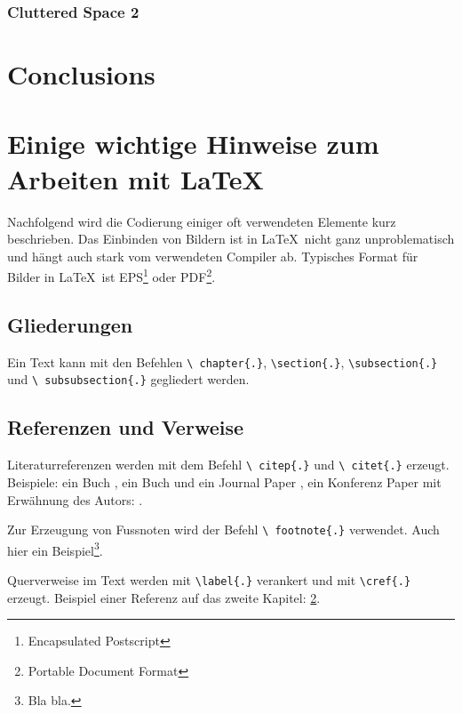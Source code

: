 \subsection{Cluttered Space 2}
\chapter{Conclusions}

\chapter{Einige wichtige Hinweise zum Arbeiten mit \LaTeX\ }
\label{sec:latexumg}

Nachfolgend wird die Codierung einiger oft verwendeten Elemente
kurz beschrieben. Das Einbinden von Bildern ist in \LaTeX\ nicht
ganz unproblematisch und hängt auch stark vom verwendeten Compiler
ab. Typisches Format für Bilder in \LaTeX\ ist
EPS\footnote{Encapsulated Postscript} oder PDF\footnote{Portable Document Format}.


\section{Gliederungen}
\label{sec:gliederung}

Ein Text kann mit den Befehlen \texttt{\textbackslash
chapter\{.\}}, \texttt{\textbackslash section\{.\}},
\texttt{\textbackslash subsection\{.\}} und \texttt{\textbackslash
subsubsection\{.\}} gegliedert werden.


\section{Referenzen und Verweise}
\label{sec:refverw}

Literaturreferenzen werden mit dem Befehl \texttt{\textbackslash
citep\{.\}} und \texttt{\textbackslash
citet\{.\}} erzeugt. Beispiele: ein Buch \citep{Raibert1986LeggedRobotsThatBalance}, ein Buch und ein Journal Paper \citep{Raibert1986LeggedRobotsThatBalance,Vukobratovic2004ZeroMomentPoint}, ein Konferenz Paper mit Erwähnung des Autors: \citet{Pratt1995SEA}.

Zur Erzeugung von Fussnoten wird der Befehl \texttt{\textbackslash
footnote\{.\}} verwendet. Auch hier ein Beispiel\footnote{Bla
bla.}.

Querverweise im Text werden mit \texttt{\textbackslash label\{.\}}
verankert und mit \texttt{\textbackslash cref\{.\}} erzeugt.
Beispiel einer Referenz auf das zweite Kapitel:
\cref{sec:latexumg}.


